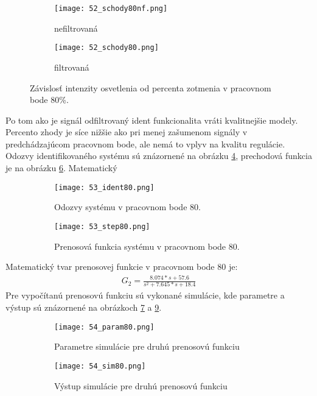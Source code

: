 \begin{figure}[!htbp]
\centering
\begin{subfigure}{0.5\linewidth}
\texttt{[image: 52\_schody80nf.png]}
\caption{nefiltrovaná}
\label{52_schodynf80}
\end{subfigure}%
\begin{subfigure}{0.5\linewidth}
\texttt{[image: 52\_schody80.png]}
\caption{filtrovaná}
\label{52_schody80}
\end{subfigure}
\caption{Závislosť intenzity osvetlenia od percenta zotmenia v pracovnom bode 80\%. }
\end{figure} 
 
Po tom ako je signál odfiltrovaný ident funkcionalita vráti kvalitnejšie modely. Percento zhody je síce nižšie ako pri menej zašumenom signály v predchádzajúcom pracovnom bode, ale nemá to vplyv na kvalitu regulácie. Odozvy identifikovaného systému sú znázornené na obrázku \ref{53_ident80}, prechodová funkcia je na obrázku \ref{53_step80}. Matematický
\begin{figure}[!htbp]
\centering
\begin{subfigure}{0.5\linewidth}
\texttt{[image: 53\_ident80.png]}
\caption{Odozvy systému v pracovnom bode 80.}
\label{53_ident80}
\end{subfigure}%
\begin{subfigure}{0.5\linewidth}
\texttt{[image: 53\_step80.png]}
\caption{Prenosová funkcia systému v pracovnom bode 80.}
\label{53_step80}
\end{subfigure}
\caption{}
\end{figure}  
Matematický tvar prenosovej funkcie v pracovnom bode 80 je:
\begin{equation} \label{eq41}
\begin{split}
 G_2 = \frac{8.074*s + 57.6}{s^2 + 7.645*s + 18.4}
\end{split}
\end{equation}
Pre vypočítanú prenosovú funkciu sú vykonané simulácie, kde parametre a výstup sú znázornené na obrázkoch \ref{54_param80} a \ref{54_sim80}.
\begin{figure}[!htbp]
\centering
\begin{subfigure}{0.5\linewidth}
\texttt{[image: 54\_param80.png]}
\caption{Parametre simulácie pre druhú prenosovú funkciu}
\label{54_param80}
\end{subfigure}%
\begin{subfigure}{0.5\linewidth}
\texttt{[image: 54\_sim80.png]}
\caption{Výstup simulácie pre druhú prenosovú funkciu}
\label{54_sim80}
\end{subfigure}
\caption{}
\end{figure}
